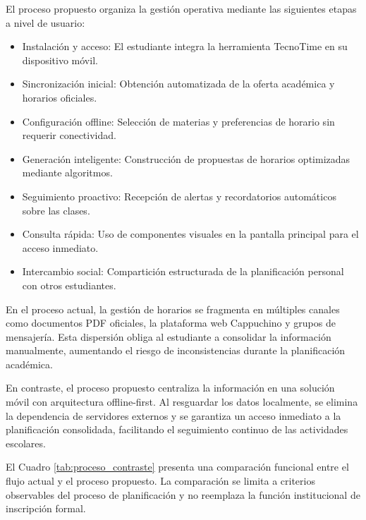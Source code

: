 El proceso propuesto organiza la gestión operativa mediante las siguientes etapas a nivel de usuario:

\begin{itemize}
    \item Instalación y acceso: El estudiante integra la herramienta TecnoTime en su dispositivo móvil.
    \item Sincronización inicial: Obtención automatizada de la oferta académica y horarios oficiales.
    \item Configuración offline: Selección de materias y preferencias de horario sin requerir conectividad.
    \item Generación inteligente: Construcción de propuestas de horarios optimizadas mediante algoritmos.
    \item Seguimiento proactivo: Recepción de alertas y recordatorios automáticos sobre las clases.
    \item Consulta rápida: Uso de componentes visuales en la pantalla principal para el acceso inmediato.
    \item Intercambio social: Compartición estructurada de la planificación personal con otros estudiantes.
\end{itemize}

En el proceso actual, la gestión de horarios se fragmenta en múltiples canales como documentos PDF oficiales, la plataforma web Cappuchino y grupos de mensajería. Esta dispersión obliga al estudiante a consolidar la información manualmente, aumentando el riesgo de inconsistencias durante la planificación académica.

En contraste, el proceso propuesto centraliza la información en una solución móvil con arquitectura offline-first. Al resguardar los datos localmente, se elimina la dependencia de servidores externos y se garantiza un acceso inmediato a la planificación consolidada, facilitando el seguimiento continuo de las actividades escolares.

El Cuadro \ref{tab:proceso_contraste} presenta una comparación funcional entre el flujo actual y el proceso propuesto. La comparación se limita a criterios observables del proceso de planificación y no reemplaza la función institucional de inscripción formal.

